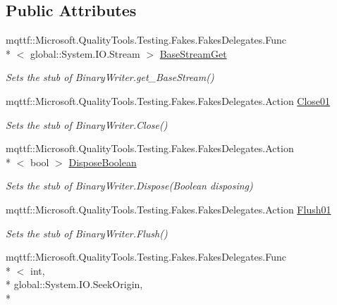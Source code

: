 \subsection*{Public Attributes}
\begin{DoxyCompactItemize}
\item 
mqttf\-::\-Microsoft.\-Quality\-Tools.\-Testing.\-Fakes.\-Fakes\-Delegates.\-Func\\*
$<$ global\-::\-System.\-I\-O.\-Stream $>$ \hyperlink{class_system_1_1_i_o_1_1_fakes_1_1_stub_binary_writer_af536714b6ebcda37b8c83410ef91ed27}{Base\-Stream\-Get}
\begin{DoxyCompactList}\small\item\em Sets the stub of Binary\-Writer.\-get\-\_\-\-Base\-Stream()\end{DoxyCompactList}\item 
mqttf\-::\-Microsoft.\-Quality\-Tools.\-Testing.\-Fakes.\-Fakes\-Delegates.\-Action \hyperlink{class_system_1_1_i_o_1_1_fakes_1_1_stub_binary_writer_a935085ba54ce44071e3e51c59ac43178}{Close01}
\begin{DoxyCompactList}\small\item\em Sets the stub of Binary\-Writer.\-Close()\end{DoxyCompactList}\item 
mqttf\-::\-Microsoft.\-Quality\-Tools.\-Testing.\-Fakes.\-Fakes\-Delegates.\-Action\\*
$<$ bool $>$ \hyperlink{class_system_1_1_i_o_1_1_fakes_1_1_stub_binary_writer_a3ffc59054fb571a1add06b74ba72477c}{Dispose\-Boolean}
\begin{DoxyCompactList}\small\item\em Sets the stub of Binary\-Writer.\-Dispose(\-Boolean disposing)\end{DoxyCompactList}\item 
mqttf\-::\-Microsoft.\-Quality\-Tools.\-Testing.\-Fakes.\-Fakes\-Delegates.\-Action \hyperlink{class_system_1_1_i_o_1_1_fakes_1_1_stub_binary_writer_a4da5dc63b29382572db34fe6b893dbfe}{Flush01}
\begin{DoxyCompactList}\small\item\em Sets the stub of Binary\-Writer.\-Flush()\end{DoxyCompactList}\item 
mqttf\-::\-Microsoft.\-Quality\-Tools.\-Testing.\-Fakes.\-Fakes\-Delegates.\-Func\\*
$<$ int, \\*
global\-::\-System.\-I\-O.\-Seek\-Origin, \\*

\end{DoxyCompactItemize}
